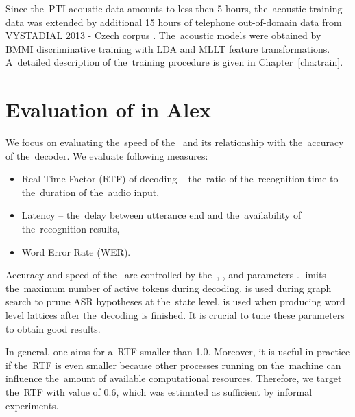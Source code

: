 Since the~PTI acoustic data amounts to less then 5 hours, the~acoustic training data was extended by additional 15 hours of telephone out-of-domain data from VYSTADIAL 2013 - Czech corpus \cite{korvas_2014}.
The~acoustic models were obtained by BMMI discriminative training with LDA and MLLT feature transformations.
A~detailed description of the~training procedure is given in Chapter~\ref{cha:train}. 


\section{Evaluation of  in Alex}
\label{sec:eval}
We focus on evaluating the~speed of the~ and its relationship with the~accuracy of the~decoder.
We evaluate following measures:
\begin{itemize}
    \item Real Time Factor (RTF) of decoding -- the~ratio of the~recognition time to the~duration of the~audio input,
    \item Latency -- the~delay between utterance end and the~availability of the~recognition results,
    \item Word Error Rate (WER).
\end{itemize}

Accuracy and speed of the~ are controlled by the~,   , and  parameters \cite{povey2011kaldi}.
 limits the~maximum number of active tokens during decoding.
 is used during graph search to prune ASR hypotheses at the~state level.
 is used when producing word level lattices after the~decoding is finished.
It is crucial to tune these parameters to obtain good results.

In general, one aims for a~\ac{RTF} smaller than 1.0.
Moreover, it is useful in practice if the~RTF is even smaller because other processes running on the~machine can influence the~amount of available computational resources.
Therefore, we target the~RTF with value of 0.6, which was estimated as sufficient by informal experiments.

